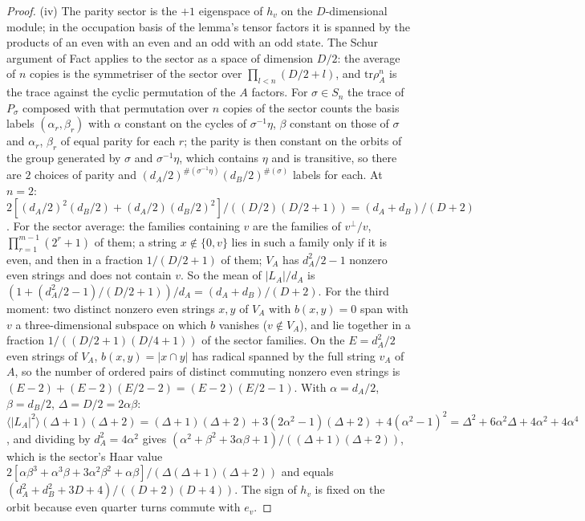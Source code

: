 \begin{proof}
(iv) The parity sector is the $+1$ eigenspace of $h_{v}$ on the $D$-dimensional module; in the occupation basis of the lemma's tensor factors it is spanned by the products of an even with an even and an odd with an odd state. The Schur argument of Fact  applies to the sector as a space of dimension $D/2$: the average of $n$ copies is the symmetriser of the sector over $\prod_{l<n}(D/2 + l)$, and $\mathrm{tr}\rho_{A}^{n}$ is the trace against the cyclic permutation of the $A$ factors. For $\sigma \in S_{n}$ the trace of $P_{\sigma}$ composed with that permutation over $n$ copies of the sector counts the basis labels $(\alpha_{r}, \beta_{r})$ with $\alpha$ constant on the cycles of $\sigma^{-1}\eta$, $\beta$ constant on those of $\sigma$ and $\alpha_{r}$, $\beta_{r}$ of equal parity for each $r$; the parity is then constant on the orbits of the group generated by $\sigma$ and $\sigma^{-1}\eta$, which contains $\eta$ and is transitive, so there are $2$ choices of parity and $(d_{A}/2)^{\#(\sigma^{-1}\eta)}(d_{B}/2)^{\#(\sigma)}$ labels for each. At $n = 2$: $2[(d_{A}/2)^{2}(d_{B}/2) + (d_{A}/2)(d_{B}/2)^{2}]/((D/2)(D/2 + 1)) = (d_{A} + d_{B})/(D + 2)$. For the sector average: the families containing $v$ are the families of $v^{\perp}/v$, $\prod_{r=1}^{m-1}(2^{r} + 1)$ of them; a string $x \notin \{0, v\}$ lies in such a family only if it is even, and then in a fraction $1/(D/2 + 1)$ of them; $V_{A}$ has $d_{A}^{2}/2 - 1$ nonzero even strings and does not contain $v$. So the mean of $|L_{A}|/d_{A}$ is $(1 + (d_{A}^{2}/2 - 1)/(D/2 + 1))/d_{A} = (d_{A} + d_{B})/(D + 2)$. For the third moment: two distinct nonzero even strings $x, y$ of $V_{A}$ with $b(x, y) = 0$ span with $v$ a three-dimensional subspace on which $b$ vanishes ($v \notin V_{A}$), and lie together in a fraction $1/((D/2 + 1)(D/4 + 1))$ of the sector families. On the $E = d_{A}^{2}/2$ even strings of $V_{A}$, $b(x, y) = |x \cap y|$ has radical spanned by the full string $v_{A}$ of $A$, so the number of ordered pairs of distinct commuting nonzero even strings is $(E - 2) + (E - 2)(E/2 - 2) = (E - 2)(E/2 - 1)$. With $\alpha = d_{A}/2$, $\beta = d_{B}/2$, $\Delta = D/2 = 2\alpha\beta$: $\langle|L_{A}|^{2}\rangle(\Delta + 1)(\Delta + 2) = (\Delta + 1)(\Delta + 2) + 3(2\alpha^{2} - 1)(\Delta + 2) + 4(\alpha^{2} - 1)^{2} = \Delta^{2} + 6\alpha^{2}\Delta + 4\alpha^{2} + 4\alpha^{4}$, and dividing by $d_{A}^{2} = 4\alpha^{2}$ gives $(\alpha^{2} + \beta^{2} + 3\alpha\beta + 1)/((\Delta + 1)(\Delta + 2))$, which is the sector's Haar value $2[\alpha\beta^{3} + \alpha^{3}\beta + 3\alpha^{2}\beta^{2} + \alpha\beta]/(\Delta(\Delta + 1)(\Delta + 2))$ and equals $(d_{A}^{2} + d_{B}^{2} + 3D + 4)/((D + 2)(D + 4))$. The sign of $h_{v}$ is fixed on the orbit because even quarter turns commute with $e_{v}$.


\end{proof}
